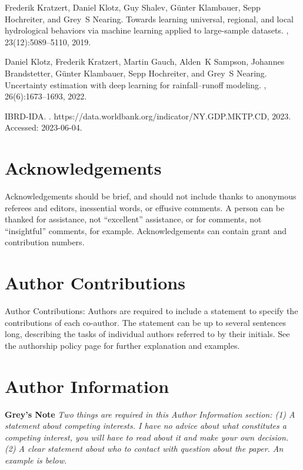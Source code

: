 \documentclass[pdflatex]{sn-jnl}
\begin{document}
\newpage
\renewcommand\refname{Methods References}
\begin{thebibliography}{10}

Frederik Kratzert, Daniel Klotz, Guy Shalev, G{\"u}nter Klambauer, Sepp
  Hochreiter, and Grey~S Nearing.
\newblock Towards learning universal, regional, and local hydrological
  behaviors via machine learning applied to large-sample datasets.
, 23(12):5089--5110, 2019.

Daniel Klotz, Frederik Kratzert, Martin Gauch, Alden~K Sampson, Johannes
  Brandstetter, G{\"u}nter Klambauer, Sepp Hochreiter, and Grey~S Nearing.
\newblock Uncertainty estimation with deep learning for rainfall--runoff
  modeling.
, 26(6):1673--1693, 2022.

IBRD-IDA.
.
\newblock https://data.worldbank.org/indicator/NY.GDP.MKTP.CD, 2023.
\newblock Accessed: 2023-06-04.

\end{thebibliography}


\newpage
\section*{Acknowledgements}
Acknowledgements should be brief, and should not include thanks to anonymous referees and editors, inessential words, or effusive comments. A person can be thanked for assistance, not “excellent” assistance, or for comments, not “insightful” comments, for example. Acknowledgements can contain grant and contribution numbers.

\section*{Author Contributions}
Author Contributions: Authors are required to include a statement to specify the contributions of each co-author. The statement can be up to several sentences long, describing the tasks of individual authors referred to by their initials. See the authorship policy page for further explanation and examples.


\section*{Author Information}
\textbf{Grey's Note} \textit{Two things are required in this Author Information section: (1) A statement about competing interests. I have no advice about what constitutes a competing interest, you will have to read about it and make your own decision. (2) A clear statement about who to contact with question about the paper. An example is below.}
\end{document}
